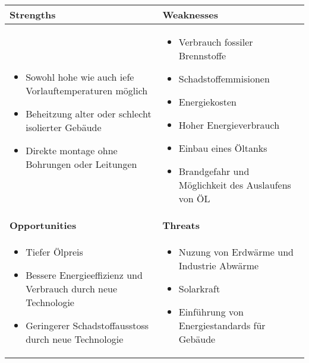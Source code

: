 \begin{tabular}[c]{|p{}|p{}|}
  \hline
  \textbf{\Large{Strengths}} &
  \textbf{\Large{Weaknesses}} \\ \hline
  
  \begin{itemize}
    \item Sowohl hohe wie auch iefe Vorlauftemperaturen möglich
    \item Beheitzung alter oder schlecht isolierter Gebäude
    \item Direkte montage ohne Bohrungen oder Leitungen
  \end{itemize}
  &
  
  \begin{itemize}
    \item Verbrauch fossiler Brennstoffe
    \item Schadstoffemmisionen
    \item Energiekosten
    \item Hoher Energieverbrauch
    \item Einbau eines Öltanks
    \item Brandgefahr und Möglichkeit des Auslaufens von ÖL
  \end{itemize}
  \\ \hline
  
  \textbf{\Large{Opportunities}} &
  \textbf{\Large{Threats}} \\ \hline
  
  \begin{itemize}
    \item Tiefer Ölpreis
    \item Bessere Energieeffizienz und Verbrauch durch neue Technologie
    \item Geringerer Schadstoffausstoss durch neue Technologie 
  \end{itemize}
  &
  
  \begin{itemize}
    \item Nuzung von Erdwärme und Industrie Abwärme
    \item Solarkraft
    \item Einführung von Energiestandards für Gebäude
  \end{itemize}  
  \\ \hline
\end{tabular}


